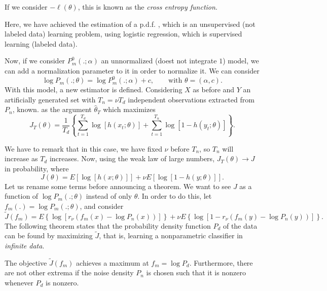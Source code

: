 \begin{remark}
If we consider $-\ell(\theta)$, this is known as the \emph{cross entropy function}.
\end{remark}

\begin{remark}
    Here, we have achieved the estimation of a p.d.f. , which is an unsupervised (not labeled data) learning problem, using logistic regression, which is supervised learning (labeled data).
\end{remark}

Now, if we consider $P_m^0(.;\alpha)$ an unnormalized (doest not integrate $1$) model, we can add a normalization parameter to it in order to normalize it. We can consider
\[
\log P_m(.;\theta) = \log P_m^0(.;\alpha ) + c  , \quad \quad \text{with } \theta=(\alpha,c).
\]
With this model, a new estimator is defined. Considering $X$ as before and $Y$ an artificially generated set with $T_n = \nu T_d$ independent observations extracted from $P_n$, known. as the argument $\hat{\theta}_T$ which maximizes
\[
J_T(\theta) = \frac{1}{T_d}\left\{\sum_{t = 1}^{T_d} \log[h(x_t;\theta)] + \sum_{t=1}^{T_n}\log[1-h(y_t;\theta)]\right\}.
\]

We have to remark that in this case, we have fixed $\nu$ before $T_n$, so $T_n$ will increase as $T_d$ increases. Now, using the weak law of large numbers, $J_T(\theta) \to J$ in probability, where
\[
J(\theta) = E\left[\log[h(x;\theta)]\right] + \nu E\left[\log[1-h(y;\theta)]\right].
\]
Let us rename some terms before announcing a theorem. We want to see $J$ as a function of $\log P_m(.;\theta)$ instead of only $\theta$. In order to do this, let $f_m(.) = \log P_m(.;\theta)$, and consider
\[
\tilde{J}(f_m) = E\left\{\log[r_\nu (f_m(x) - \log P_n(x))]\right\} + \nu E\left\{\log [1- r_\nu(f_m(y) - \log P_n(y))]\right\}.    
\]
The following theorem states that the probability density function $P_d$ of the data can be found by maximizing $\tilde{J}$, that is, learning a nonparametric classifier in \emph{infinite data}.

\begin{nthC}
The objective $\tilde{J}(f_m)$ achieves a maximum at $f_m = \log P_d$. Furthermore, there are not other extrema if the noise density $P_n$ is chosen such that it is nonzero whenever $P_d$ is nonzero.
\end{nthC}
